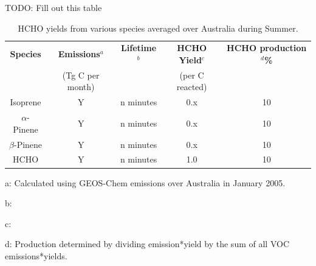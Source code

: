     TODO: Fill out this table
    \begin{table} \begin{threeparttable}
        \caption{HCHO yields from various species averaged over Australia during Summer.}
        \begin{tabular}{ | c  c  c  c  c | }
          \toprule
          \textbf{Species}   & \textbf{Emissions$^a$}& \textbf{Lifetime$^b$}& \textbf{HCHO Yield$^c$} & \textbf{HCHO production$^d$\%}
          \\                 & (Tg C per month)      &                      & (per C reacted)         &         \\
          \midrule
          Isoprene           & Y                     & n minutes            & 0.x                     & 10       \\
          $\alpha$-Pinene    & Y                     & n minutes            & 0.x                     & 10       \\
          $\beta$-Pinene     & Y                     & n minutes            & 0.x                     & 10       \\
          HCHO               & Y                     & n minutes            & 1.0                     & 10       \\
          \bottomrule
        \end{tabular}
        \begin{tablenotes} 
          \item a: Calculated using GEOS-Chem emissions over Australia in January 2005.
          \item b:  
          \item c: 
          \item d: Production determined by dividing emission*yield by the sum of all VOC emissions*yields. 
        \end{tablenotes}
        \label{BioIsop:Method:tab_VOCAusYields}
      \end{threeparttable} \end{table}
      
      
